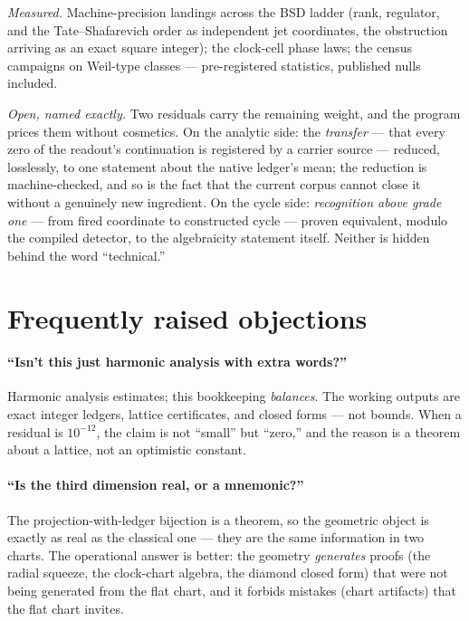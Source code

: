 \documentclass[11pt]{article}
\begin{document}
\emph{Measured.}  Machine-precision landings across the BSD ladder (rank,
regulator, and the Tate--Shafarevich order as independent jet coordinates,
the obstruction arriving as an exact square integer); the clock-cell phase laws;
the census campaigns on Weil-type classes --- pre-registered statistics,
published nulls included.

\emph{Open, named exactly.}  Two residuals carry the remaining weight, and the
program prices them without cosmetics.  On the analytic side: the
\emph{transfer} --- that every zero of the readout's continuation is registered
by a carrier source --- reduced, losslessly, to one statement about the native
ledger's mean; the reduction is machine-checked, and so is the fact that the
current corpus cannot close it without a genuinely new ingredient.  On the
cycle side: \emph{recognition above grade one} --- from fired coordinate to
constructed cycle --- proven equivalent, modulo the compiled detector, to the
algebraicity statement itself.  Neither is hidden behind the word ``technical.''

\section{Frequently raised objections}

\paragraph{``Isn't this just harmonic analysis with extra words?''}
Harmonic analysis estimates; this bookkeeping \emph{balances}.  The working
outputs are exact integer ledgers, lattice certificates, and closed forms --- not
bounds.  When a residual is $10^{-12}$, the claim is not ``small'' but ``zero,''
and the reason is a theorem about a lattice, not an optimistic constant.

\paragraph{``Is the third dimension real, or a mnemonic?''}
The projection-with-ledger bijection is a theorem, so the geometric object is
exactly as real as the classical one --- they are the same information in two
charts.  The operational answer is better: the geometry \emph{generates} proofs
(the radial squeeze, the clock-chart algebra, the diamond closed form) that were
not being generated from the flat chart, and it forbids mistakes (chart
artifacts) that the flat chart invites.
\end{document}
